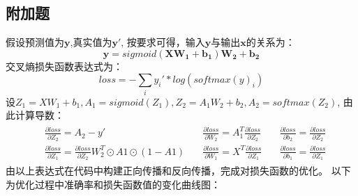 \documentclass{article}
\begin{document}
\subsection{附加题}
假设预测值为$\mathbf{y}$,真实值为$\mathbf{y}'$,
按要求可得，输入$\mathbf{y}$与输出$\mathbf{x}$的关系为：
\begin{displaymath}
    \mathbf{y}= sigmoid(\mathbf{X}\mathbf{W_1}+\mathbf{b_1})\mathbf{W_2}+\mathbf{b_2}
\end{displaymath}
交叉熵损失函数表达式为：
\begin{displaymath}
    loss = - \sum_i y_i'*log(softmax(y)_i)
\end{displaymath}
设$Z_1=XW_1+b_1,A_1=sigmoid(Z_1),Z_2=A_1W_2+b_2,A_2=softmax(Z_2)$,
由此计算导数：
\begin{eqnarray*}
    \begin{aligned}
    &\frac{\partial loss}{\partial Z_2}=A_2-y'
    &\quad\frac{\partial loss}{\partial W_2}=A_1^T\frac{\partial loss}{\partial Z_2}
    &\quad\frac{\partial loss}{\partial b_2}=\frac{\partial loss}{\partial Z_2}\\
    &\frac{\partial loss}{\partial Z_1}=\frac{\partial loss}{\partial Z_2}W_2^T\odot A1\odot(1-A1)
    &\quad\frac{\partial loss}{\partial W_1}=X^T\frac{\partial loss}{\partial Z_1}
    &\quad\frac{\partial loss}{\partial b_1}=\frac{\partial loss}{\partial Z_1}
    \end{aligned}
\end{eqnarray*}
由以上表达式在代码中构建正向传播和反向传播，完成对损失函数的优化。
以下为优化过程中准确率和损失函数值的变化曲线图：\\
\end{document}
